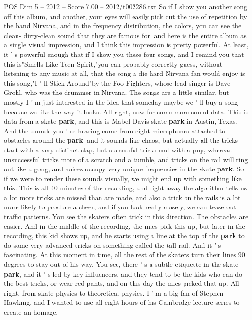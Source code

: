 \begin{textsample}{POS Dim 5 – 2012 – Score 7.00 – 2012/t002286.txt}
So if I show you another song off this album, and another, your eyes will easily pick out the use of repetition by the band Nirvana, and in the frequency distribution, the colors, you can see the clean- dirty-clean sound that they are famous for, and here is the entire album as a single visual impression, and I think this impression is pretty powerful.
At least, it ' s powerful enough that if I show you these four songs, and I remind you that this is"Smells Like Teen Spirit,"you can probably correctly guess, without listening to any music at all, that the song a die hard Nirvana fan would enjoy is this song,"I ' ll Stick Around"by the Foo Fighters, whose lead singer is Dave Grohl, who was the drummer in Nirvana.
The songs are a little similar, but mostly I ' m just interested in the idea that someday maybe we ' ll buy a song because we like the way it looks.
All right, now for some more sound data.
This is data from a skate \textbf{park}, and this is Mabel Davis skate \textbf{park} in Austin, Texas.
And the sounds you ' re hearing came from eight microphones attached to obstacles around the \textbf{park}, and it sounds like chaos, but actually all the tricks start with a very distinct slap, but successful tricks end with a pop, whereas unsuccessful tricks more of a scratch and a tumble, and tricks on the rail will ring out like a gong, and voices occupy very unique frequencies in the skate \textbf{park}.
So if we were to render these sounds visually, we might end up with something like this.
This is all 40 minutes of the recording, and right away the algorithm tells us a lot more tricks are missed than are made, and also a trick on the rails is a lot more likely to produce a cheer, and if you look really closely, we can tease out traffic patterns.
You see the skaters often trick in this direction.
The obstacles are easier.
And in the middle of the recording, the mics pick this up, but later in the recording, this kid shows up, and he starts using a line at the top of the \textbf{park} to do some very advanced tricks on something called the tall rail.
And it ' s fascinating.
At this moment in time, all the rest of the skaters turn their lines 90 degrees to stay out of his way.
You see, there ' s a subtle etiquette in the skate \textbf{park}, and it ' s led by key influencers, and they tend to be the kids who can do the best tricks, or wear red pants, and on this day the mics picked that up.
All right, from skate physics to theoretical physics.
I ' m a big fan of Stephen Hawking, and I wanted to use all eight hours of his Cambridge lecture series to create an homage.

\end{textsample}
